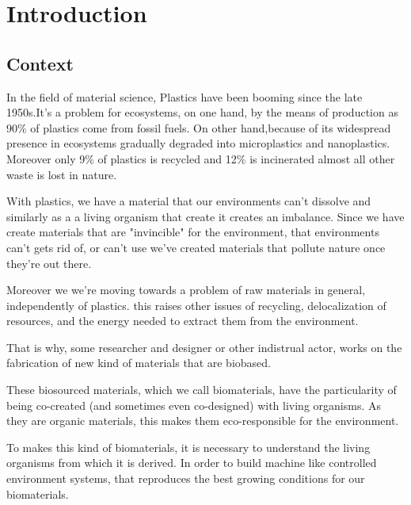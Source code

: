 \chapter{Introduction}

\section{Context}
In the field of material science, Plastics have been booming since the late 1950s\cite{geyer2017production}.It's a problem for ecosystems, on one hand, by the means of production as 90\% of plastics come from fossil fuels. On other hand,because of its widespread presence in ecosystems gradually degraded into microplastics and nanoplastics. Moreover only 9\% of plastics is recycled and 12\% is incinerated almost all other waste is lost in nature\cite{natureeditorial}.




With plastics, we have a material that our environments can't dissolve and similarly as a a living organism that create it creates an imbalance. Since we have create materials that are "invincible" for the environment,  that environments can't gets rid of, or can't use we've created materials that pollute nature once they're out there.

Moreover we we're moving towards a problem of raw materials in general, independently of plastics. this raises other issues of recycling, delocalization of resources, and the energy needed to extract them from the environment.

That is why, some researcher and designer or other indistrual actor, works on the fabrication of new kind of materials that are biobased.
 
These biosourced materials, which we call biomaterials, have the particularity of being co-created (and sometimes even co-designed) with living organisms. As they are organic materials, this makes them eco-responsible for the environment. 

To makes this kind of biomaterials, it is necessary to understand the living organisms from which it is derived. In order to build machine like controlled environment systems, that reproduces the best growing conditions for our biomaterials.

